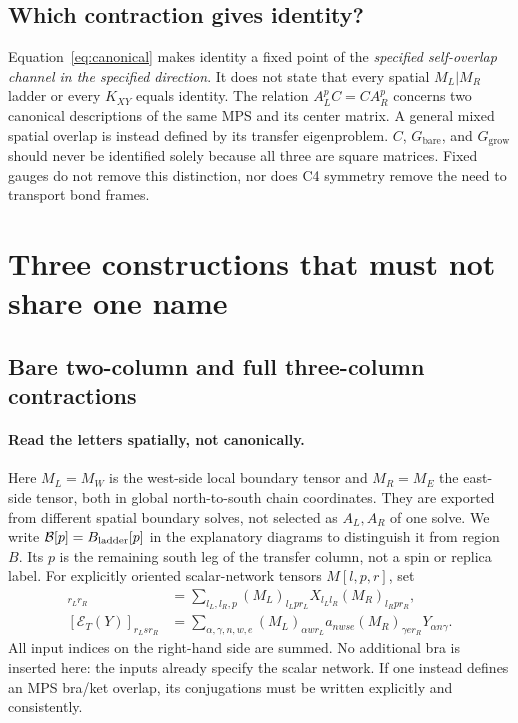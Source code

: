 \documentclass[11pt]{article}
\newcommand{\Gz}{G_{\mathrm{bare}}}
\newcommand{\Gt}{G_{\mathrm{grow}}}
\begin{document}
\subsection{Which contraction gives identity?}
Equation~\eqref{eq:canonical} makes identity a fixed point of the \emph{specified
self-overlap channel in the specified direction}. It does not state that
every spatial $M_L|M_R$ ladder or every $K_{XY}$ equals identity. The relation
$A_L^p C=C A_R^p$ concerns two canonical descriptions of the same MPS and its
center matrix. A general mixed spatial overlap is instead defined by its
transfer eigenproblem. $C$, $\Gz$, and $\Gt$ should never be identified solely
because all three are square matrices. Fixed gauges do not remove this
distinction, nor does C4 symmetry remove the need to transport bond frames.
\fi

\section{Three constructions that must not share one name}
\subsection{Bare two-column and full three-column contractions}
\label{sec:bare}
\ifdetailed
\paragraph{Read the letters spatially, not canonically.}
Here $M_L=M_W$ is the west-side local boundary tensor and $M_R=M_E$ the
east-side tensor, both in global north-to-south chain coordinates. They are
exported from different spatial boundary solves, not selected as $A_L,A_R$
of one solve. We write $\mathcal B[p]=B_{\rm ladder}[p]$ in the explanatory
diagrams to distinguish it from region $B$. Its $p$ is the remaining south
leg of the transfer column, not a spin or replica label.
\fi
For explicitly oriented scalar-network tensors $M[l,p,r]$, set
\begin{align}
 [\mathcal E_0(X)]_{r_Lr_R}
 &=\sum_{l_L,l_R,p}(M_L)_{l_Lpr_L}X_{l_Ll_R}(M_R)_{l_Rpr_R},\label{eq:bare}\\
 [\mathcal E_T(Y)]_{r_Lsr_R}
 &=\sum_{\alpha,\gamma,n,w,e}(M_L)_{\alpha wr_L}
 a_{nwse}(M_R)_{\gamma er_R}Y_{\alpha n\gamma}.
 \label{eq:three}
\end{align}
All input indices on the right-hand side are summed. No additional bra is inserted here:
the inputs already specify the scalar network. If one instead defines an MPS
bra/ket overlap, its conjugations must be written explicitly and consistently.
\end{document}
